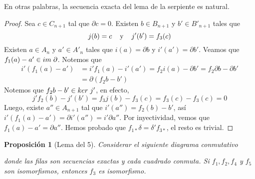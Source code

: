 \documentclass[aop]{imsart2}
\theoremstyle{plain}
\newtheorem{prop}[teo]{Proposición}
\theoremstyle{remark}
\newcommand{\hhtext}[1]{\hspace{4mm}\text{#1}\hspace{4mm}}
\newcommand{\im}[1]{im\hspace{1mm}#1}
\newcommand{\kr}[1]{ker\hspace{1mm}#1}
\begin{document}
\noindent En otras palabras, la secuencia exacta del lema de la serpiente es natural.

\begin{proof}
    Sea $c\in C_{n+1}$ tal que $\partial c=0$. Existen $b\in B_{n+1}$ y $b'\in B'_{n+1}$ tales que
    \begin{equation*}
        j(b)=c
        \hhtext{y}
        j'(b')=f_{3}(c)
    \end{equation*}
    Existen $a\in A_{n}$ y $a'\in A'_{n}$ tales que $i(a)=\partial b$ y $i'(a')=\partial b'$. 
    Veamos que $f_{1}(a)-a'\in\im{\partial}$. Notemos que
    \begin{align*}
        i'(f_{1}(a)-a') &= i'f_{1}(a)-i'(a')=f_{2}i(a)-\partial b'=f_{2}\partial b-\partial b' \\
        &= \partial(f_{2}b-b')
    \end{align*}
    Notemos que $f_{2}b-b'\in\kr{j'}$, en efecto,
    \begin{equation*}
        j'f_{2}(b)-j'(b')=f_{3}j(b)-f_{3}(c)=f_{3}(c)-f_{3}(c)=0
    \end{equation*}
    Luego, existe $a''\in A_{n+1}$ tal que $i'(a'')=f_{2}(b)-b'$, así 
    $i'(f_{1}(a)-a')=\partial i'(a'')=i'\partial a''$. Por inyectividad, vemos que 
    $f_{1}(a)-a'=\partial a''$. Hemos probado que $f_{1*}\delta=\delta' f_{3*}$, el resto es 
    trivial.
\end{proof}

\begin{prop}[Lema del 5]
    Considerar el siguiente diagrama conmutativo
    
    \vspace{2mm}
    \centerline{
    }

    \vspace{2mm}
    \noindent donde las filas son secuencias exactas y cada cuadrado conmuta. Si 
    $f_{1},f_{2},f_{4}$ y $f_{5}$ son isomorfismos, entonces $f_{3}$ es isomorfismo.
\end{prop}
\end{document}
